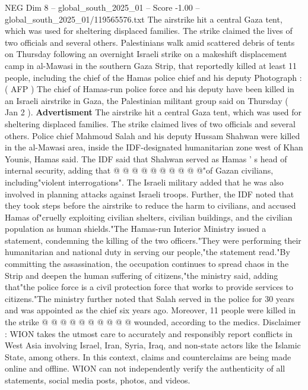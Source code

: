 \begin{textsample}{NEG Dim 8 – global\_south\_2025\_01 – Score -1.00 – global\_south\_2025\_01/119565576.txt}  \label{ex:f8_neg_131}
The airstrike hit a central Gaza tent, which was used for sheltering displaced families.
The strike claimed the lives of two officials and several others.
Palestinians walk amid scattered debris of tents on Thursday following an overnight Israeli strike on a makeshift displacement camp in al-Mawasi in the southern Gaza Strip, that reportedly killed at least 11 people, including the chief of the Hamas police chief and his deputy Photograph : ( AFP ) The chief of Hamas-run police force and his deputy have been killed in an Israeli airstrike in Gaza, the Palestinian militant group said on Thursday ( Jan 2 ). \textbf{Advertisment} The airstrike hit a central Gaza tent, which was used for sheltering displaced families.
The strike claimed lives of two officials and several others.
Police chief Mahmoud Salah and his deputy Hussam Shahwan were killed in the al-Mawasi area, inside the IDF-designated humanitarian zone west of Khan Younis, Hamas said.
The IDF said that Shahwan served as Hamas ' s head of internal security, adding that @ @ @ @ @ @ @ @ @ @"of Gazan civilians, including"violent interrogations".
The Israeli military added that he was also involved in planning attacks against Israeli troops.
Further, the IDF noted that they took steps before the airstrike to reduce the harm to civilians, and accused Hamas of"cruelly exploiting civilian shelters, civilian buildings, and the civilian population as human shields."The Hamas-run Interior Ministry issued a statement, condemning the killing of the two officers."They were performing their humanitarian and national duty in serving our people,"the statement read."By committing the assassination, the occupation continues to spread chaos in the Strip and deepen the human suffering of citizens,"the ministry said, adding that"the police force is a civil protection force that works to provide services to citizens."The ministry further noted that Salah served in the police for 30 years and was appointed as the chief six years ago.
Moreover, 11 people were killed in the strike @ @ @ @ @ @ @ @ @ @ wounded, according to the medics.
Disclaimer : WION takes the utmost care to accurately and responsibly report conflicts in West Asia involving Israel, Iran, Syria, Iraq, and non-state actors like the Islamic State, among others.
In this context, claims and counterclaims are being made online and offline.
WION can not independently verify the authenticity of all statements, social media posts, photos, and videos.

\end{textsample}
